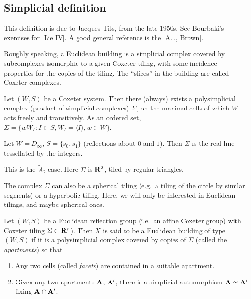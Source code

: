 \documentclass{article}
\begin{document}
\subsection{Simplicial definition}

This definition is due to Jacques Tits, from the late 1950s. See Bourbaki's 
exercises for [Lie IV]. A good general reference is the [A..., Brown]. 

Roughly speaking, a Euclidean building is a simplicial complex covered by 
subcomplexes isomorphic to a given Coxeter tiling, with some incidence 
properties for the copies of the tiling. The ``slices'' in the building are 
called Coxeter complexes. 

Let $(W,S)$ be a Coxeter system. Then there (always) exists a polysimplicial 
complex (product of simplicial complexes) $\Sigma$, on the maximal 
cells of which $W$ acts freely and transitively. As an ordered set, 
$\Sigma=\{w W_I:I\subset S,W_I=\langle I\rangle, w\in W\}$. 

\begin{example}
Let $W=D_\infty$, $S=\{s_0,s_1\}$ (reflections about $0$ and $1$). Then 
$\Sigma$ is the real line tessellated by the integers. 
\end{example}

\begin{example}
This is the $\widetilde A_2$ case. Here $\Sigma$ is $\mathbf{R}^2$, tiled by regular 
triangles. 
\end{example}

The complex $\Sigma$ can also be a spherical tiling (e.g.\ a tiling of the 
circle by similar segments) or a hyperbolic tiling. Here, we will only be 
interested in Euclidean tilings, and maybe spherical ones. 

\begin{definition}
Let $(W,S)$ be a Euclidean reflection group (i.e.\ an affine Coxeter group) with 
Coxeter tiling $\Sigma\subset \mathbf{R}^r$). Then $X$ is said to be a Euclidean 
building of type $(W,S)$ if it is a polysimplicial complex covered by copies of 
$\Sigma$ (called the \emph{apartments}) so that 
\begin{enumerate}
  \item Any two cells (called \emph{facets}) are contained in a suitable apartment. 
  \item Given any two apartments $\mathbf{A}$, $\mathbf{A}'$, there is a simplicial 
    automorphism $\mathbf{A}\simeq \mathbf{A}'$ fixing $\mathbf{A}\cap \mathbf{A}'$. 
\end{enumerate}
\end{definition}
\end{document}
